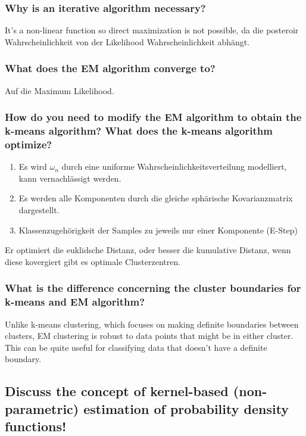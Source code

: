 \documentclass[12pt]{scrartcl}
\begin{document}
\subsubsection{Why is an iterative algorithm necessary?}
It's a non-linear function so direct maximization is not possible, da die posteroir Wahrscheinlichkeit von der Likelihood Wahrscheinlichkeit abhängt.

\subsubsection{What does the EM algorithm converge to?}
Auf die Maximum Likelihood.

\subsubsection{How do you need to modify the EM algorithm to obtain the k-means algorithm? What does the k-means algorithm optimize?}

\begin{enumerate}
\item Es wird $\omega_n$ durch eine uniforme Wahrscheinlichkeitsverteilung modelliert, kann vernachlässigt werden.
\item Es werden alle Komponenten durch die gleiche sphärische Kovarianzmatrix dargestellt.
\item Klassenzugehörigkeit der Samples zu jeweils nur einer Komponente (E-Step)
\end{enumerate}
Er optimiert die euklidsche Distanz, oder besser die kumulative Distanz, wenn diese kovergiert gibt es optimale Clusterzentren.

\subsubsection{What is the difference concerning the cluster boundaries for k-means and EM algorithm?}

Unlike k-means clustering, which focuses on making definite boundaries between clusters, EM clustering is robust to data points that might be in either cluster. This can be quite useful for classifying data that doesn't have a definite boundary.

\subsection{Discuss the concept of kernel-based (non-parametric) estimation of probability density functions!}
\end{document}
